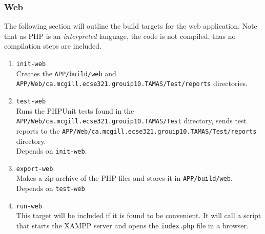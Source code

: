 \documentclass[12pt]{report}
\begin{document}
\subsubsection{Web}
The following section will outline the build targets for the web application. Note that as PHP is an
\textit{interpreted} language, the code is not compiled, thus no compilation steps are included.
\begin{enumerate}
	\item \texttt{init-web}\\
		Creates the \texttt{APP/build/web} and
		\texttt{APP/Web/ca.mcgill.ecse321.grouip10.TAMAS/Test/reports} directories.
	\item \texttt{test-web}\\
		Runs the PHPUnit tests found in
		the \texttt{APP/Web/ca.mcgill.ecse321.grouip10.TAMAS/Test} directory, sends test reports to
		the \texttt{APP/Web/ca.mcgill.ecse321.grouip10.TAMAS/Test/reports} directory.\\
		Depends on \texttt{init-web}.
	\item \texttt{export-web}\\
		Makes a zip archive of the PHP files and stores it in \texttt{APP/build/web}.\\
		Depends on \texttt{test-web}
	\item \texttt{run-web}\\
		This target will be included if it is found to be convenient. It will call a script that
		starts the XAMPP server and opens the \texttt{index.php} file in a browser.
\end{enumerate}
\end{document}
